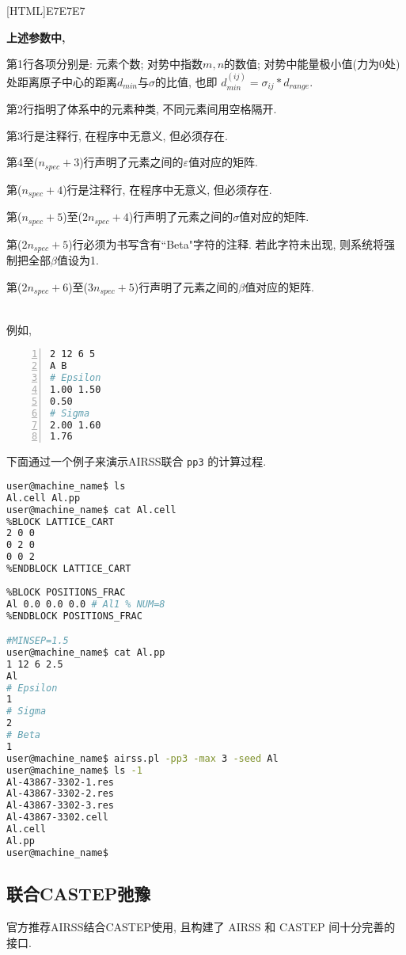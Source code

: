 \documentclass[a4paper, 10pt]{article}
\begin{document}
\noindent{}[HTML]{E7E7E7}{\parbox{\textwidth}{%
\noindent \textbf{上述参数中, }
\begin{maineu}
  \item 第1行各项分别是: 元素个数; 对势中指数\(m,n\)的数值; 对势中能量极小值(力为0处)处距离原子中心的距离\(d_{min}\)与\(\sigma\)的比值, 也即 \(d_{min}^{(ij)} = \sigma_{ij}*d_{range}\). 
  \item 第2行指明了体系中的元素种类, 不同元素间用空格隔开. 
  \item 第3行是注释行, 在程序中无意义, 但必须存在. 
  \item 第4至(\(n_{spec}+3\))行声明了元素之间的\(\varepsilon\)值对应的矩阵.
  \item 第(\(n_{spec}+4\))行是注释行, 在程序中无意义, 但必须存在. 
  \item 第(\(n_{spec}+5\))至(\(2n_{spec}+4\))行声明了元素之间的\(\sigma\)值对应的矩阵.
  \item 第(\(2n_{spec}+5\))行必须为书写含有``Beta"字符的注释. 若此字符未出现, 则系统将强制把全部\(\beta\)值设为1.
  \item 第(\(2n_{spec}+6\))至(\(3n_{spec}+5\))行声明了元素之间的\(\beta\)值对应的矩阵.
\end{maineu}}}\\

例如,
\begin{lstlisting}[language={bash},numbers=left]
2 12 6 5
A B
# Epsilon
1.00 1.50
0.50
# Sigma
2.00 1.60
1.76
\end{lstlisting}

下面通过一个例子来演示AIRSS联合 \verb|pp3| 的计算过程.
\begin{lstlisting}[language={bash}]
user@machine_name$ ls 
Al.cell Al.pp
user@machine_name$ cat Al.cell
%BLOCK LATTICE_CART
2 0 0
0 2 0
0 0 2 
%ENDBLOCK LATTICE_CART
 
%BLOCK POSITIONS_FRAC
Al 0.0 0.0 0.0 # Al1 % NUM=8
%ENDBLOCK POSITIONS_FRAC

#MINSEP=1.5
user@machine_name$ cat Al.pp
1 12 6 2.5
Al
# Epsilon
1
# Sigma
2
# Beta
1
user@machine_name$ airss.pl -pp3 -max 3 -seed Al
user@machine_name$ ls -1
Al-43867-3302-1.res
Al-43867-3302-2.res
Al-43867-3302-3.res
Al-43867-3302.cell
Al.cell
Al.pp
user@machine_name$
\end{lstlisting}

\subsection{联合CASTEP弛豫}
官方推荐AIRSS结合CASTEP使用, 且构建了 AIRSS 和 CASTEP 间十分完善的接口. 
\end{document}
